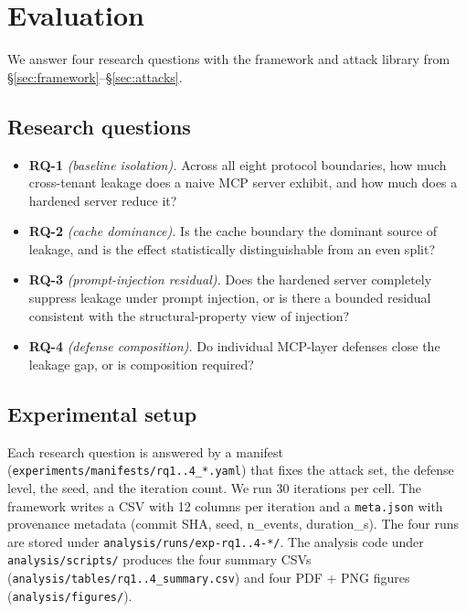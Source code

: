 
\section{Evaluation}\label{sec:evaluation}

We answer four research questions with the framework and
attack library from \S\ref{sec:framework}--\S\ref{sec:attacks}.

\subsection{Research questions}

\begin{itemize}
  \item \textbf{RQ-1} \emph{(baseline isolation).} Across all
        eight protocol boundaries, how much cross-tenant
        leakage does a naive MCP server exhibit, and how much
        does a hardened server reduce it?
  \item \textbf{RQ-2} \emph{(cache dominance).} Is the cache
        boundary the dominant source of leakage, and is the
        effect statistically distinguishable from an even
        split?
  \item \textbf{RQ-3} \emph{(prompt-injection residual).} Does
        the hardened server completely suppress leakage under
        prompt injection, or is there a bounded residual
        consistent with the structural-property view of
        injection?
  \item \textbf{RQ-4} \emph{(defense composition).} Do
        individual MCP-layer defenses close the leakage gap,
        or is composition required?
\end{itemize}

\subsection{Experimental setup}

Each research question is answered by a manifest
(\texttt{experiments/manifests/rq{1..4}\_*.yaml}) that fixes
the attack set, the defense level, the seed, and the iteration
count. We run 30 iterations per cell. The framework writes a
CSV with 12 columns per iteration and a \texttt{meta.json}
with provenance metadata (commit SHA, seed, n\_events,
duration\_s). The four runs are stored under
\texttt{analysis/runs/exp-rq{1..4}-*/}. The analysis code
under \texttt{analysis/scripts/} produces the four summary
CSVs (\texttt{analysis/tables/rq{1..4}\_summary.csv}) and
four PDF + PNG figures (\texttt{analysis/figures/}).

